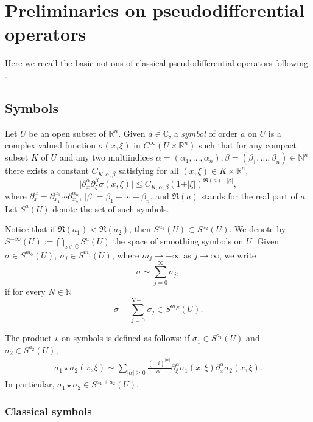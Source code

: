 \section{Preliminaries on pseudodif\/ferential operators}\label{section2}

Here we recall the basic notions of classical pseudodif\/ferential operators following \cite{Shubin}.

\subsection{Symbols}

Let $U$ be an open subset of $\mathbb{R}^n$. Given $a\in\mathbb{C}$, a {\it symbol} of order $a$ on $U$ is a complex valued function $\sigma(x,\xi)$ in $C^{\infty}(U\times\mathbb{R}^n)$ such that for any compact subset $K$ of $U$ and any two multiindices $\alpha=(\alpha_1,\dots,\alpha_n), \beta=(\beta_1,\dots,\beta_n) \in \mathbb{N}^n$ there exists a constant $C_{K, \alpha, \beta}$ satisfying for all $(x,\xi)\in K\times\mathbb{R}^n$,
\[
\big| \partial_x^{\alpha}\partial_{\xi}^{\beta}\sigma(x,\xi) \big| \leq C_{K, \alpha, \beta}(1+ \vert \xi \vert )^{\Re(a)- \vert \beta\vert},
\]
where $\partial_x^{\alpha}=\partial_{x_1}^{\alpha_1}\cdots\partial_{x_n}^{\alpha_n}$, $\vert \beta\vert = \beta_1+\cdots+\beta_n$, and $\Re(a)$ stands for the real part of $a$. Let $S^{a}(U)$ denote the set of such symbols.

Notice that if $\Re(a_1)<\Re(a_2)$, then $S^{a_1}(U)\subset S^{a_2}(U)$. We denote by $S^{-\infty}(U):= \bigcap\limits_{a \in \mathbb{C}}S^a(U)$ the space of smoothing symbols on $U$. Given $\sigma\in S^{m_0}(U),\ \sigma_j\in S^{m_j}(U)$, where $m_j\to-\infty$ as $j\to\infty$, we write
\[
\sigma\sim\sum_{j=0}^\infty\sigma_j,
\]
if for every $N\in\mathbb{N}$
\[
\sigma-\sum_{j=0}^{N-1}\sigma_j\in S^{m_N}(U).
\]

The product $\star$ on symbols is def\/ined as follows: if $\sigma_1 \in S^{a_1}(U)$ and $\sigma_2\in S^{a_2}(U)$,
\begin{gather}
\sigma_1\star \sigma_2(x, \xi) \sim \sum_{|\alpha|\geq0}\frac{(-i)^{\vert\alpha\vert}}{\alpha!}\partial_{\xi}^{\alpha} \sigma_1(x,\xi)\partial_x^{\alpha}\sigma_2(x,\xi). \label{eq:starproduct}
\end{gather}
In particular, $\sigma_1\star \sigma_2 \in S^{a_1 + a_2}(U)$.

\subsubsection{Classical symbols}\label{sectionsymbols}

